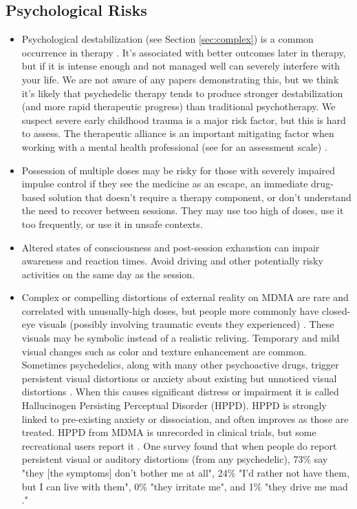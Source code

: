 \documentclass[12pt,letterpaper]{book}
\begin{document}
\subsection*{Psychological Risks}
\begin{itemize}
    \item Psychological destabilization (see Section \ref{sec:complex}) is a common occurrence in therapy \cite{olthofDestabilization}. It's associated with better outcomes later in therapy, but if it is intense enough and not managed well can severely interfere with your life. We are not aware of any papers demonstrating this, but we think it's likely that psychedelic therapy tends to produce stronger destabilization (and more rapid therapeutic progress) than traditional psychotherapy. We suspect severe early childhood trauma is a major risk factor, but this is hard to assess. The therapeutic alliance is an important mitigating factor when working with a mental health professional (see \textcite{BRWAIdownload} for an assessment scale) \cite{fluckiger2018alliance}.
    \item Possession of multiple doses may be risky for those with severely impaired impulse control if they see the medicine as an escape, an immediate drug-based solution that doesn't require a therapy component, or don't understand the need to recover between sessions. They may use too high of doses, use it too frequently, or use it in unsafe contexts.
    \item Altered states of consciousness and post-session exhaustion can impair awareness and reaction times. Avoid driving and other potentially risky activities on the same day as the session.
    \item Complex or compelling distortions of external reality on MDMA are rare and correlated with unusually-high doses, but people more commonly have closed-eye visuals (possibly involving traumatic events they experienced) \cite{liechtiGender}. These visuals may be symbolic instead of a realistic reliving. Temporary and mild visual changes such as color and texture enhancement are common. Sometimes psychedelics, along with many other psychoactive drugs, trigger persistent visual distortions or anxiety about existing but unnoticed visual distortions \cite{alexanderHPPD,halpernHPPD}. When this causes significant distress or impairment it is called Hallucinogen Persisting Perceptual Disorder (HPPD). HPPD is strongly linked to pre-existing anxiety or dissociation, and often improves as those are treated. HPPD from MDMA is unrecorded in clinical trials, but some recreational users report it \cite{vizeliActuteEffects,litjensHPPD}. One survey found that when people do report persistent visual or auditory distortions (from any psychedelic), 73\% say "they [the symptoms] don't bother me at all", 24\% "I'd rather not have them, but I can live with them", 0\% "they irritate me", and 1\% "they drive me mad \cite{carhart2010user}."

\end{itemize}
\end{document}
